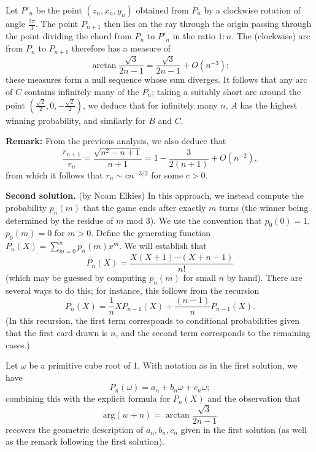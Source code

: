 \documentclass[amssymb,twocolumn,pra,10pt,aps]{revtex4-1}
\begin{document}
\begin{itemize}
Let $P'_n$ be the point $(z_n, x_n, y_n)$ obtained from $P_n$ by a clockwise rotation of angle $\frac{2\pi}{3}$.
The point $P_{n+1}$ then lies on the ray through the origin passing through the point dividing the chord from $P_n$ to $P'_n$ in the ratio $1:n$. 
The (clockwise) arc from $P_n$ to $P_{n+1}$ therefore has a measure of
\[
\arctan \frac{\sqrt{3}}{2n-1}
= \frac{\sqrt{3}}{2n-1} + O(n^{-3});
\]
these measures form a null sequence whose sum diverges. It follows that any arc of $C$ contains infinitely many of the $P_n$; taking a suitably short arc around the point $(\frac{\sqrt{2}}{2}, 0, -\frac{\sqrt{2}}{2})$, we deduce that for infinitely many $n$, $A$ has the highest winning probability, and similarly for $B$ and $C$.

\noindent
\textbf{Remark:}
From the previous analysis, we also deduce that
\[
\frac{r_{n+1}}{r_n} = \frac{\sqrt{n^2-n+1}}{n+1} = 1 - \frac{3}{2(n+1)} + O(n^{-2}),
\]
from which it follows that $r_n \sim c n^{-3/2}$ for some $c>0$.

\noindent
\textbf{Second solution.}
(by Noam Elkies)
In this approach, we instead compute the probability $p_n(m)$ that the game ends after exactly $m$ turns
(the winner being determined by the residue of $m$ mod 3).
We use the convention that $p_0(0) = 1$, $p_0(m) = 0$ for $m>0$.
Define the generating function $P_n(X) = \sum_{m=0}^n p_n(m) x^m$.
We will establish that
\[
P_n(X) = \frac{X(X+1)\cdots(X+n-1)}{n!}
\]
(which may be guessed by computing $p_n(m)$ for small $n$ by hand). There are several ways to do this; for instance,
this follows from the recursion
\[
P_n(X) = \frac{1}{n} X P_{n-1}(X) + \frac{(n-1)}{n} P_{n-1}(X).
\]
(In this recursion, the first term corresponds to conditional probabilities given that the first card drawn is $n$,
and the second term corresponds to the remaining cases.)

Let $\omega$ be a primitive cube root of 1. With notation as in the first solution,
we have
\[
P_n(\omega) = a_n + b_n \omega + c_n \omega;
\]
combining this with the explicit formula for $P_n(X)$ and the observation that
\[
\mathrm{arg}(w+n) = \arctan \frac{\sqrt{3}}{2n-1}
\]
recovers the geometric description of $a_n, b_n, c_n$
given in the first solution (as well as the remark following the first solution).


\end{itemize}
\end{document}

